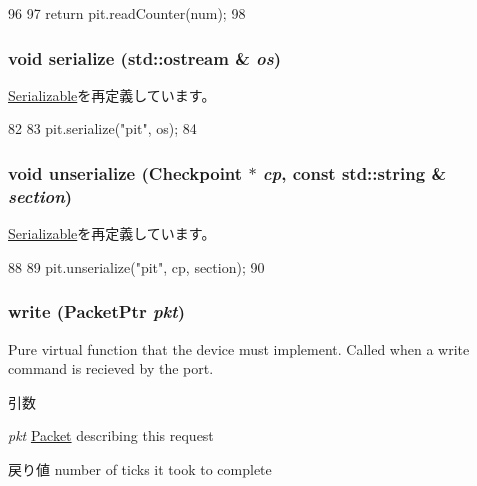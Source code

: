 \begin{DoxyCode}
96     {
97         return pit.readCounter(num);
98     }
\end{DoxyCode}
\hypertarget{classX86ISA_1_1I8254_a53e036786d17361be4c7320d39c99b84}{
\subsubsection[{serialize}]{\setlength{\rightskip}{0pt plus 5cm}void serialize (std::ostream \& {\em os})}}
\label{classX86ISA_1_1I8254_a53e036786d17361be4c7320d39c99b84}


\hyperlink{classSerializable_ad6272f80ae37e8331e3969b3f072a801}{Serializable}を再定義しています。


\begin{DoxyCode}
82 {
83     pit.serialize("pit", os);
84 }
\end{DoxyCode}
\hypertarget{classX86ISA_1_1I8254_af22e5d6d660b97db37003ac61ac4ee49}{
\subsubsection[{unserialize}]{\setlength{\rightskip}{0pt plus 5cm}void unserialize ({\bf Checkpoint} $\ast$ {\em cp}, \/  const std::string \& {\em section})}}
\label{classX86ISA_1_1I8254_af22e5d6d660b97db37003ac61ac4ee49}


\hyperlink{classSerializable_af100c4e9feabf3cd918619c88c718387}{Serializable}を再定義しています。


\begin{DoxyCode}
88 {
89     pit.unserialize("pit", cp, section);
90 }
\end{DoxyCode}
\hypertarget{classX86ISA_1_1I8254_a4cefab464e72b5dd42c003a0a4341802}{
\subsubsection[{write}]{ write ({\bf PacketPtr} {\em pkt})}}
\label{classX86ISA_1_1I8254_a4cefab464e72b5dd42c003a0a4341802}
Pure virtual function that the device must implement. Called when a write command is recieved by the port. 
\begin{DoxyParams}{引数}
\item[{\em pkt}]\hyperlink{classPacket}{Packet} describing this request \end{DoxyParams}
\begin{DoxyReturn}{戻り値}
number of ticks it took to complete 
\end{DoxyReturn}


